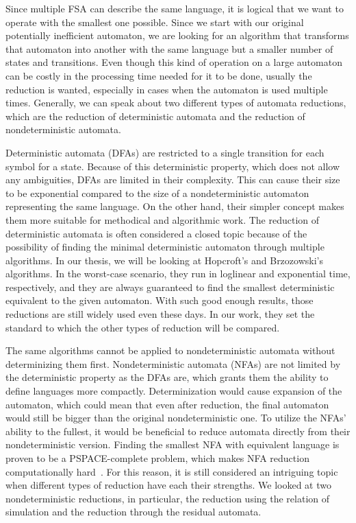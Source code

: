 Since multiple FSA can describe the same language, it is logical that we want to operate with the smallest one possible. Since we start with our original potentially inefficient automaton, we are looking for an algorithm that transforms that automaton into another with the same language but a smaller number of states and transitions. Even though this kind of operation on a large automaton can be costly in the processing time needed for it to be done, usually the reduction is wanted, especially in cases when the automaton is used multiple times.
Generally, we can speak about two different types of automata reductions, which are the reduction of deterministic automata and the reduction of nondeterministic automata.


Deterministic automata (DFAs) are restricted to a single transition for each symbol for a state. Because of this deterministic property, which does not allow any ambiguities, DFAs are limited in their complexity. This can cause their size to be exponential compared to the size of a nondeterministic automaton representing the same language. On the other hand, their simpler concept makes them more suitable for methodical and algorithmic work. The reduction of deterministic automata is often considered a closed topic because of the possibility of finding the minimal deterministic automaton through multiple algorithms. In our thesis, we will be looking at Hopcroft's and Brzozowski's algorithms. In the worst-case scenario, they run in loglinear and exponential time, respectively, and they are always guaranteed to find the smallest deterministic equivalent to the given automaton. With such good enough results, those reductions are still widely used even these days. In our work, they set the standard to which the other types of reduction will be compared.


The same algorithms cannot be applied to nondeterministic automata without determinizing them first. Nondeterministic automata (NFAs) are not limited by the deterministic property as the DFAs are, which grants them the ability to define languages more compactly. Determinization would cause expansion of the automaton, which could mean that even after reduction, the final automaton would still be bigger than the original nondeterministic one. To utilize the NFAs' ability to the fullest, it would be beneficial to reduce automata directly from their nondeterministic version. Finding the smallest NFA with equivalent language is proven to be a PSPACE-complete problem, which makes NFA reduction computationally hard~\cite{Jiang93}. For this reason, it is still considered an intriguing topic when different types of reduction have each their strengths. We looked at two nondeterministic reductions, in particular, the reduction using the relation of simulation and the reduction through the residual automata.

